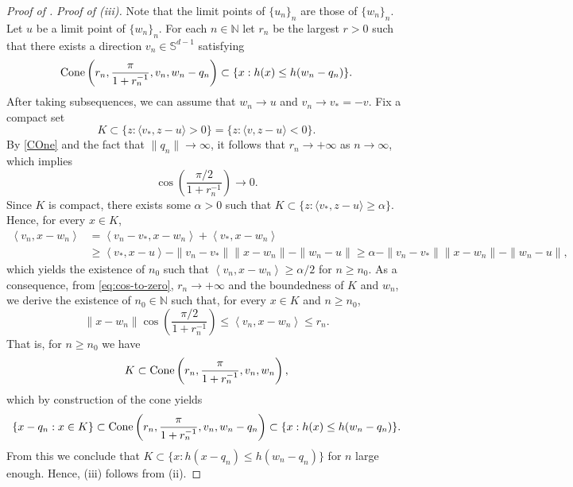 \documentclass[11pt]{article}
\newcommand{\NN}{\mathbb{N}}
\theoremstyle{plain}
\theoremstyle{definition}\newtheorem{definition}[theorem]{Definition}
\theoremstyle{remark}
\begin{document}
\begin{proof}[Proof of ]
{\it Proof of (iii).} Note that the limit points of $\{u_n\}_n$ are those of $\{w_n\}_n$. Let $u$ be a limit point of $\{w_n\}_n$. 
%
For each $n\in \NN$ let $r_n$ be the largest $r>0$ such that there exists a direction $v_n\in \mathbb{S}^{d-1}$ satisfying 
$$ {\rm Cone}\left(r_n, \frac{ \pi }{1+r_n^{-1}}, {v}_n,w_n-q_n\right)  \subset \{ x: h(x) \leq  h(w_n-q_n) \} .$$
 After taking  subsequences, we can assume that $w_n\to u$ and $v_n\to v_*=-v$.  Fix a compact set  $$K\subset \{z: \langle v_*, z -u\rangle>0\}=  \{z: \langle v, z -u\rangle<0\}.$$ By \ref{COne} and the fact that $\|q_n\|\to \infty$,  it follows that $r_n\to +\infty$ as $n\to \infty$, which implies 
\begin{equation}
    \label{eq:cos-to-zero}
    \cos\left( \frac{ \pi/2 }{1+r_n^{-1}} \right) \to 0.
\end{equation}
 Since $K$ is compact, there exists some $\alpha>0$ such that $K\subset \{z: \langle v_*, z -u\rangle\geq \alpha\} $. 
Hence,  for every $x\in K$, 
\begin{align*}
    \left\langle v_n, x-w_n \right\rangle &= \left\langle v_n-v_*, x-w_n \right\rangle+ \left\langle v_*, {x}-w_n \right\rangle\\
    &\geq \left\langle v_*, x-u \right\rangle-\|v_n-v_*\|  \| x-w_n\| - \| w_n-u\|\geq  \alpha -\|v_n-v_*\|  \| x-w_n\| - \| w_n-u\|,
\end{align*}
which yields the existence of $n_0$ such that $ \left\langle v_n, x-w_n \right\rangle\geq \alpha/2$ for $n\geq n_0$. As a consequence,  from \eqref{eq:cos-to-zero},  $r_n\to +\infty$ and the boundedness of $K$ and $w_n$, we derive the existence of $n_0\in \NN$ such that, for every $x\in K$ and $n\geq n_0$, 
$$  \| x-w_n\|  \cos\left( \frac{ \pi /2}{1+r_n^{-1}} \right) \leq \left\langle v_n, x-w_n \right\rangle \leq r_n .$$
 That is, for $n\geq n_0$ we have
%
$$K\subset {\rm Cone}\left(r_n, \frac{ \pi }{1+r_n^{-1}}, {v}_n,w_n\right),  $$
%
which by construction of the cone yields  
%
$$\{x-q_n: x\in K\} \subset {\rm Cone}\left(r_n, \frac{ \pi }{1+r_n^{-1}}, {v}_n,w_n-q_n\right) \subset \{ x: h(x) \leq  h(w_n-q_n) \}. $$
From this we conclude that 
$K \subset \{ x: h(x-q_n) \leq  h(w_n-q_n) \}$ for $n$ large enough. Hence,  (iii) follows from (ii). 
\end{proof}
\end{document}
